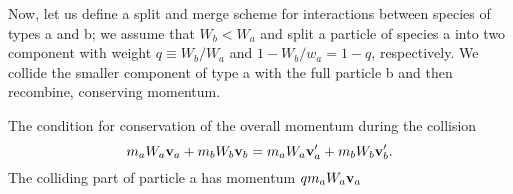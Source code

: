 \documentclass[12pt]{article}
\newcommand{\bv}{{\bf v}}
\newcommand{\va}{\bv_a}
\newcommand{\vb}{\bv_b}
\newcommand{\vap}{\va^\prime}
\newcommand{\vbp}{\vb^\prime}
\begin{document}
Now, let us define a split and merge scheme for interactions between
species of types a and b; we assume that $W_b < W_a$ and split a
particle of species a into two component with weight $q\equiv W_b/W_a$
and $1 - W_b/w_a = 1 - q$, respectively.  We collide the smaller
component of type a with the full particle b and then recombine,
conserving momentum.


The condition for conservation of the overall momentum during the collision 
\begin{equation}
  m_a W_a \va + m_ b W_b \vb = m_a W_a \vap + m_b W_b \vbp.
\end{equation}
The colliding part of particle a has momentum $q m_a W_a \va$





\label{sec:ref}
\end{document}
